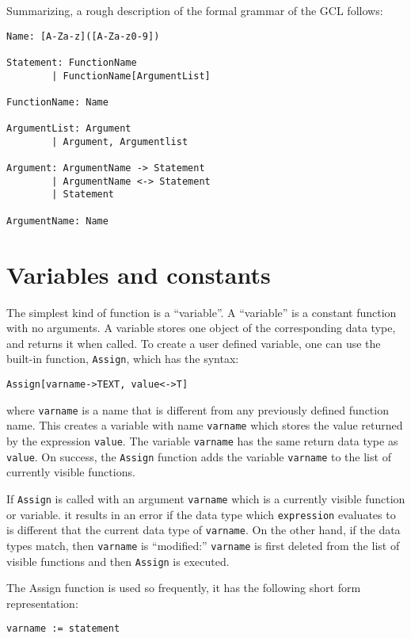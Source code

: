 Summarizing, a rough description of the formal grammar of the GCL
follows:

\begin{verbatim}
Name: [A-Za-z]([A-Za-z0-9])

Statement: FunctionName
        | FunctionName[ArgumentList]

FunctionName: Name

ArgumentList: Argument
        | Argument, Argumentlist

Argument: ArgumentName -> Statement
        | ArgumentName <-> Statement
        | Statement

ArgumentName: Name
\end{verbatim}

\section{Variables and constants}

The simplest kind of function is a ``variable''.  A ``variable'' is a
constant function with no arguments.  A variable stores one object of
the corresponding data type, and returns it when called.  To create a
user defined variable, one can use the built-in function,
\verb+Assign+, which has the syntax:
\begin{verbatim}
Assign[varname->TEXT, value<->T]
\end{verbatim}
where \verb+varname+ is a name that is different from any previously
defined function name.  This creates a variable with name
\verb+varname+ which stores the value returned by the expression
\verb+value+.  The variable \verb+varname+ has the same return data
type as \verb+value+.  On success, the \verb+Assign+ function adds the
variable \verb+varname+ to the list of currently visible functions.

If \verb+Assign+ is called with an argument \verb+varname+ which is a
currently visible function or variable. it results in an error if the
data type which \verb+expression+ evaluates to is different that the
current data type of \verb+varname+.  On the other hand, if the data
types match, then \verb+varname+ is ``modified:'' \verb+varname+ is
first deleted from the list of visible functions and then
\verb+Assign+ is executed.

The Assign function is used so frequently, it has the following short form
representation:
\begin{verbatim}
varname := statement
\end{verbatim}


